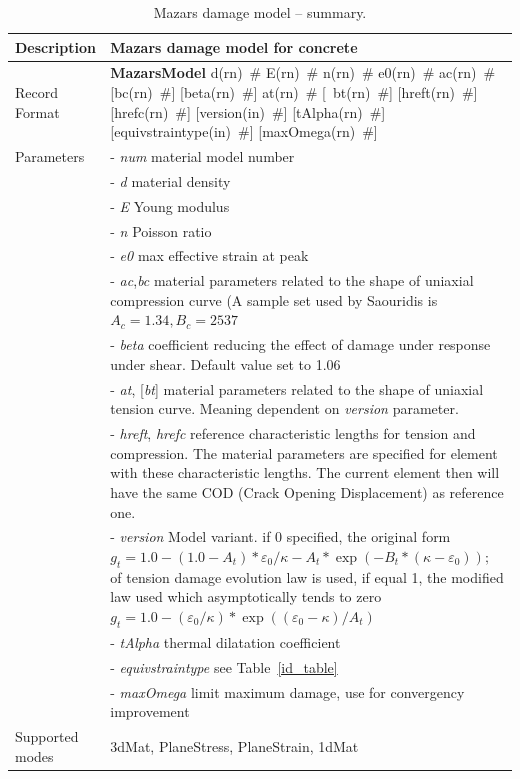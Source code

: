 \documentclass[a4paper]{article}
\newcommand{\descitem}[1]{{\noindent \bf #1}}
\newcommand{\elemparam}[2]{{{#1\tiny (#2)}~\#}}
\newcommand{\optelemparam}[2]{[{~\elemparam{#1}{#2}}]}
\newcommand{\param}[1]{{\it #1}}
\newcommand{\optparam}[1]{[{\it #1}]}
\begin{document}
\begin{table}[!htb]
\begin{tabular}{|l|p{9cm}|}
\hline
Description & Mazars damage model for concrete\\
\hline
Record Format & \descitem{MazarsModel} \elemparam{d}{rn} \elemparam{E}{rn}
\elemparam{n}{rn}  \elemparam{e0}{rn}
\elemparam{ac}{rn} [\elemparam{bc}{rn}] [\elemparam{beta}{rn}]
\elemparam{at}{rn} \optelemparam{bt}{rn}
[\elemparam{hreft}{rn}] [\elemparam{hrefc}{rn}]
[\elemparam{version}{in}] [\elemparam{tAlpha}{rn}] [\elemparam{equivstraintype}{in}]
[\elemparam{maxOmega}{rn}]\\
Parameters &- \param{num} material model number\\
&- \param{d} material density\\
&- \param{E} Young modulus\\
&- \param{n} Poisson ratio\\
&- \param{e0} max effective strain at peak\\
&- \param{ac},\param{bc} material parameters related to the shape of
uniaxial compression curve (A sample set used by Saouridis is $A_c =
1.34, B_c = 2537$\\
&- \param{beta} coefficient reducing the effect of damage under
response under shear. Default value set to 1.06\\
&- \param{at}, \optparam{bt} material parameters related to the shape of
uniaxial tension curve. Meaning dependent on \param{version}
parameter.\\
&- \param{hreft}, \param{hrefc} reference characteristic lengths for
tension and compression. The material parameters are specified for
element with these characteristic lengths. The current element then
will have the same COD (Crack Opening Displacement) as reference one.\\
&- \param{version} Model variant. if 0 specified, the original form
$g_t= 1.0-(1.0-A_t)*\varepsilon_0/\kappa - A_t*\exp(-B_t*(\kappa-\varepsilon_0));
$ of
tension damage evolution law is used, if equal 1, the modified law
used which asymptotically tends to zero
$g_t = 1.0-(\varepsilon_0/\kappa)*\exp((\varepsilon_0-\kappa)/A_t)$\\
&- \param{tAlpha} thermal dilatation coefficient\\
&- \param{equivstraintype} see Table~\ref{id_table}\\
&- \param{maxOmega} limit maximum damage, use for convergency improvement\\
Supported modes& 3dMat, PlaneStress, PlaneStrain, 1dMat\\
\hline
\end{tabular}
\caption{Mazars damage model  -- summary.}
\label{maz_table}
\end{table}
\end{document}
